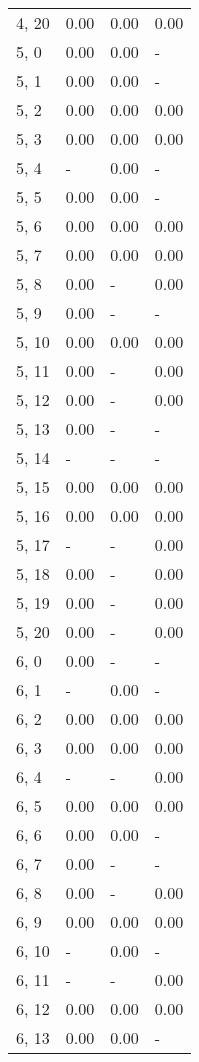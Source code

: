 \begin{table}
\begin{tabular}{llll}
4, 20  &  0.00 &  0.00 &  0.00 \\
5, 0   &  0.00 &  0.00 &     - \\
5, 1   &  0.00 &  0.00 &     - \\
5, 2   &  0.00 &  0.00 &  0.00 \\
5, 3   &  0.00 &  0.00 &  0.00 \\
5, 4   &     - &  0.00 &     - \\
5, 5   &  0.00 &  0.00 &     - \\
5, 6   &  0.00 &  0.00 &  0.00 \\
5, 7   &  0.00 &  0.00 &  0.00 \\
5, 8   &  0.00 &     - &  0.00 \\
5, 9   &  0.00 &     - &     - \\
5, 10  &  0.00 &  0.00 &  0.00 \\
5, 11  &  0.00 &     - &  0.00 \\
5, 12  &  0.00 &     - &  0.00 \\
5, 13  &  0.00 &     - &     - \\
5, 14  &     - &     - &     - \\
5, 15  &  0.00 &  0.00 &  0.00 \\
5, 16  &  0.00 &  0.00 &  0.00 \\
5, 17  &     - &     - &  0.00 \\
5, 18  &  0.00 &     - &  0.00 \\
5, 19  &  0.00 &     - &  0.00 \\
5, 20  &  0.00 &     - &  0.00 \\
6, 0   &  0.00 &     - &     - \\
6, 1   &     - &  0.00 &     - \\
6, 2   &  0.00 &  0.00 &  0.00 \\
6, 3   &  0.00 &  0.00 &  0.00 \\
6, 4   &     - &     - &  0.00 \\
6, 5   &  0.00 &  0.00 &  0.00 \\
6, 6   &  0.00 &  0.00 &     - \\
6, 7   &  0.00 &     - &     - \\
6, 8   &  0.00 &     - &  0.00 \\
6, 9   &  0.00 &  0.00 &  0.00 \\
6, 10  &     - &  0.00 &     - \\
6, 11  &     - &     - &  0.00 \\
6, 12  &  0.00 &  0.00 &  0.00 \\
6, 13  &  0.00 &  0.00 &     - \\

\end{tabular}
\end{table}
